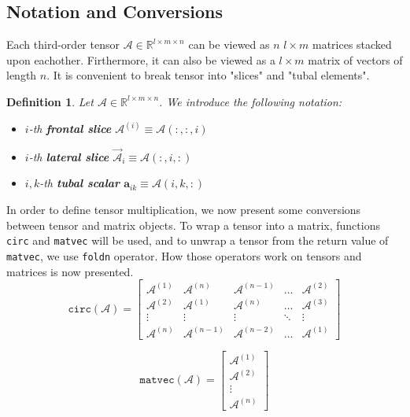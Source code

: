 \documentclass[twoside]{article}
\newtheorem{defn}{Definition}
\newcommand{\code}[1]{\texttt{#1}}
\begin{document}
\begin{multicols}{2}
\subsection{Notation and Conversions}
Each third-order tensor $\mathcal{A} \in \mathbb{R}^{l \times m \times n}$ can be viewed as $n$ $l \times m$ matrices stacked upon eachother. Firthermore, it can also be viewed as a $l \times m$ matrix of vectors of length $n$. It is convenient to break tensor into "slices" and "tubal elements".
\begin{defn} Let $\mathcal{A} \in \mathbb{R}^{l \times m \times n}$. We introduce the following notation:
\begin{itemize}
	\item $i$-th \textbf{frontal slice} $\mathcal{A}^{(i)} \equiv \mathcal{A}(:,:,i)$
	\item $i$-th \textbf{lateral slice} $\overrightarrow{\mathcal{A}}_i \equiv \mathcal{A}(:,i,:)$
	\item $i,k$-th \textbf{tubal scalar} $\textbf{a}_{ik} \equiv \mathcal{A}(i,k,:)$
\end{itemize}
\end{defn}

In order to define tensor multiplication, we now present some conversions between tensor and matrix objects. To wrap a tensor into a matrix, functions \code{circ} and \code{matvec} will be used, and to unwrap a tensor from the return value of \code{matvec}, we use \code{foldn} operator. How those operators work on tensors and matrices is now presented.
\[
\code{circ}(\mathcal{A}) =
  \begin{bmatrix}
    \mathcal{A}^{(1)} & \mathcal{A}^{(n)} & \mathcal{A}^{(n-1)} & \dots & \mathcal{A}^{(2)} \\
    \mathcal{A}^{(2)} & \mathcal{A}^{(1)} & \mathcal{A}^{(n)}   &  \dots  & \mathcal{A}^{(3)} \\
    \vdots            & \vdots            & \vdots              &  \ddots & \vdots \\
    \mathcal{A}^{(n)} & \mathcal{A}^{(n-1)} & \mathcal{A}^{(n-2)}   &  \dots & \mathcal{A}^{(1)} 
  \end{bmatrix}
\]

\[
\code{matvec}(\mathcal{A}) =
  \begin{bmatrix}
    \mathcal{A}^{(1)} \\
    \mathcal{A}^{(2)} \\
    \vdots            \\
    \mathcal{A}^{(n)} 
  \end{bmatrix}
\]


\end{multicols}
\end{document}
